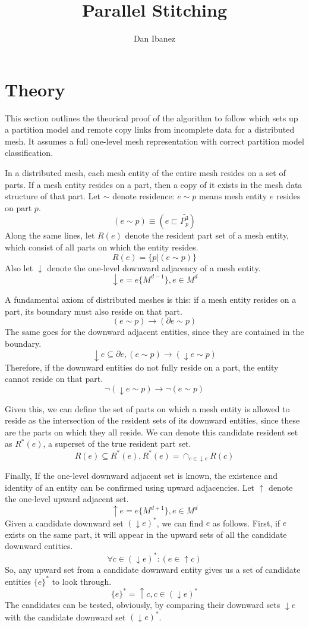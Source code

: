 \documentclass{article}
\title{Parallel Stitching}
\author{Dan Ibanez}
\begin{document}
\maketitle

\section{Theory}

This section outlines the theorical proof of the algorithm
to follow which sets up a partition model and remote
copy links from incomplete data for a distributed mesh.
It assumes a full one-level mesh representation with
correct partition model classification.

In a distributed mesh, each mesh entity of the entire mesh
resides on a set of parts.
If a mesh entity resides on a part, then a copy of it exists
in the mesh data structure of that part.
Let $\sim$ denote residence: $e\sim p$ means mesh entity $e$ resides
on part $p$.
\[(e \sim p)\equiv(e \sqsubset \bar{P^3_p})\]
Along the same lines, let $R(e)$ denote the resident part set of
a mesh entity, which consist of all parts on which the entity resides.
\[R(e) = \{p|(e\sim p)\}\]
Also let $\downarrow$ denote the one-level downward adjacency of
a mesh entity.
\[\downarrow e = e\{M^{d-1}\}, e \in M^d\]

A fundamental axiom of distributed meshes is this: if a
mesh entity resides on a part, its boundary must also reside
on that part.
\[(e\sim p) \to (\partial e\sim p)\]
The same goes for the downward adjacent entities, since they are contained
in the boundary.
\[\downarrow e \subseteq \partial e,
(e\sim p)\to(\downarrow e\sim p)\]
Therefore, if the downward entities do
not fully reside on a part, the entity cannot reside on that part.
\[\neg (\downarrow e\sim p) \to \neg (e\sim p)\]

Given this, we can define the set of parts on which a mesh entity
is allowed to reside as the intersection of the resident sets of
its downward entities, since these are the parts on which
they all reside.
We can denote this candidate resident set as $R^*(e)$, a superset
of the true resident part set.
\[R(e) \subseteq R^*(e), R^*(e) = \cap_{c\in \downarrow e} R(c)\]

Finally, If the one-level downward adjacent set is known,
the existence and identity of an entity can be confirmed
using upward adjacencies.
Let $\uparrow$ denote the one-level upward adjacent set.
\[\uparrow e = e\{M^{d+1}\}, e \in M^d\]
Given a candidate downward set $(\downarrow e)^*$, we can
find $e$ as follows.
First, if $e$ exists on the same part, it will appear in
the upward sets of all the candidate downward entities.
\[\forall c\in (\downarrow e)^* : (e \in \uparrow c)\]
So, any upward set from a candidate downward entity
gives us a set of candidate entities $\{e\}^*$
to look through.
\[\{e\}^* = \uparrow c, c \in (\downarrow e)^*\]
The candidates can be tested, obviously, by comparing
their downward sets $\downarrow e$ with the candidate
downward set $(\downarrow e)^*$.
\end{document}
